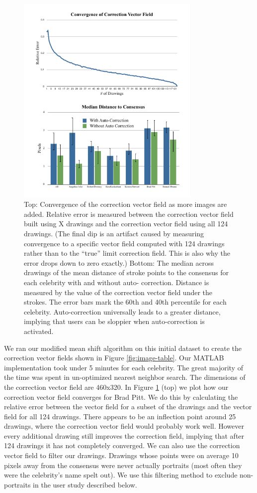 \begin{figure}[!t]
  \centering%
\includegraphics[width=3.5in]{./figures/userstudy/twoGraph.pdf}

  \caption{Top: Convergence of the correction vector field as more
images are added. Relative error is measured between the correction
vector field built using X drawings and the correction vector field
using all 124 drawings. (The final dip is an artifact caused by
measuring convergence to a specific vector field computed with 124 drawings rather than to the ``true'' limit correction field. This is also why the error drops down to zero exactly.) Bottom: The median
across drawings of the mean distance of stroke points to the
consensus for each celebrity with and without auto- correction.
Distance is measured by the value of the correction vector field
under the strokes. The error bars mark the 60th and 40th percentile
for each celebrity. Auto-correction universally leads to a greater
distance, implying that users can be sloppier when auto-correction
is activated.}

  \label{fig:daf-two}
\end{figure}

We ran our modified mean shift algorithm on this initial dataset to create the correction vector fields shown in Figure \ref{fig:image-table}. Our MATLAB implementation took under 5 minutes for each celebrity.  The great majority of the time was spent in un-optimized nearest neighbor search. The dimensions of the correction vector field are 460x320. In Figure \ref{fig:daf-two} (top) we plot how our correction vector field converges for Brad Pitt. We do this by calculating the relative error between the vector field for a subset of the drawings and the vector field for all 124 drawings. There appears to be an inflection point around 25 drawings, where the correction vector field would probably work well. However every additional drawing still improves the correction field, implying that after 124 drawings it has not completely converged. We can also use the correction vector field to filter our drawings. Drawings whose points were on average 10 pixels away from the consensus were never actually portraits (most often they were the celebrity's name spelt out). We use this filtering method to exclude non-portraits in the user study described below.

